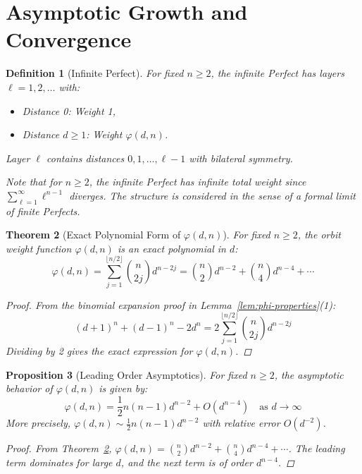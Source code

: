 \documentclass[11pt]{article}
\newtheorem{definition}{Definition}[section]
\newtheorem{theorem}[definition]{Theorem}
\newtheorem{proposition}[definition]{Proposition}
\begin{document}

\section{Asymptotic Growth and Convergence}\label{sec:asymptotics}

\begin{definition}[Infinite Perfect]\label{def:infinite-perfect}
For fixed $n \geq 2$, the infinite Perfect has layers $\ell = 1,2,\ldots$ with:
\begin{itemize}
    \item Distance 0: Weight 1,
    \item Distance $d \geq 1$: Weight $\varphi(d,n)$.
\end{itemize}
Layer $\ell$ contains distances $0, 1, \ldots, \ell-1$ with bilateral symmetry.

Note that for $n \geq 2$, the infinite Perfect has infinite total weight since $\sum_{\ell=1}^{\infty} \ell^{n-1}$ diverges. The structure is considered in the sense of a formal limit of finite Perfects.
\end{definition}

\begin{theorem}[Exact Polynomial Form of $\varphi(d,n)$]\label{thm:exact-polynomial}
For fixed $n \geq 2$, the orbit weight function $\varphi(d,n)$ is an exact polynomial in $d$:
\[
\varphi(d,n) = \sum_{j=1}^{\lfloor n/2 \rfloor} \binom{n}{2j} d^{n-2j}
= \binom{n}{2} d^{n-2} + \binom{n}{4} d^{n-4} + \cdots
\]
\begin{proof}
From the binomial expansion proof in Lemma~\ref{lem:phi-properties}(1):
\[
(d+1)^n + (d-1)^n - 2d^n = 2\sum_{j=1}^{\lfloor n/2 \rfloor} \binom{n}{2j} d^{n-2j}
\]
Dividing by 2 gives the exact expression for $\varphi(d,n)$.
\end{proof}
\end{theorem}

\begin{proposition}[Leading Order Asymptotics]\label{prop:leading-asymptotics}
For fixed $n \geq 2$, the asymptotic behavior of $\varphi(d,n)$ is given by:
\[
\varphi(d,n) = \frac{1}{2}n(n-1)d^{n-2} + O(d^{n-4}) \quad \text{as } d \to \infty
\]
More precisely, $\varphi(d,n) \sim \frac{1}{2}n(n-1)d^{n-2}$ with relative error $O(d^{-2})$.
\begin{proof}
From Theorem~\ref{thm:exact-polynomial}, $\varphi(d,n) = \binom{n}{2}d^{n-2} + \binom{n}{4}d^{n-4} + \cdots$.
The leading term dominates for large $d$, and the next term is of order $d^{n-4}$.
\end{proof}
\end{proposition}
\end{document}
